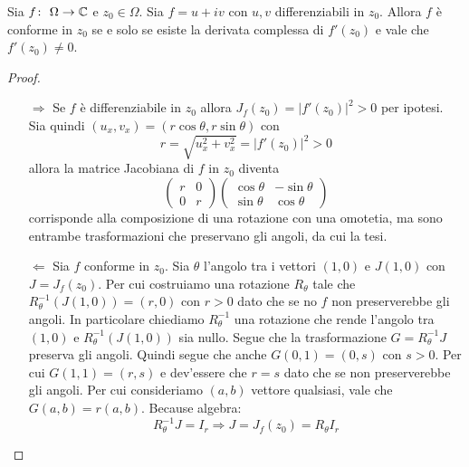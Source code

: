 \begin{theorem}
 \label{thr:conferme_sse_jacobiana_non_nulla}
  Sia $f \colon\ \Omega \rightarrow \mathbb{C}$ e $z_0 \in \Omega$. Sia $f = u + iv$ con $u,v$
  differenziabili in $z_0$. Allora $f$ è conforme in $z_0$ se e solo se esiste
  la derivata complessa di $f'(z_0)$ e vale che $f'(z_0) \neq 0$.
\end{theorem}
\begin{proof}\
  \begin{enumerate}
    \item[$\Rightarrow$] Se $f$ è differenziabile in $z_0$ allora $J_f(z_0) = 
      |f'(z_0)|^2 > 0$ per ipotesi. Sia quindi $(u_x,v_x) = (r\cos\theta, 
      r\sin\theta)$ con 
      \begin{equation*}
        r = \sqrt{u_x^2 + v_x^2} = |f'(z_0)|^2 > 0 
      \end{equation*}
      allora la matrice Jacobiana di $f$ in $z_0$ diventa
      \begin{equation*}
        \left(\begin{array}{cc}
          r & 0 \\
          0 & r
      \end{array}\right)
       \left( \begin{array}{cc}
          \cos\theta & - \sin \theta \\
          \sin \theta & \cos \theta
      \end{array}\right)
      \end{equation*}
      corrisponde alla composizione di una rotazione con una omotetia, ma sono
      entrambe trasformazioni che preservano gli angoli, da cui la tesi.
    \item[$\Leftarrow$] Sia $f$ conforme in $z_0$. Sia $\theta$ l'angolo tra
      i vettori $(1,0)$ e $J(1,0)$ con $J = J_f(z_0)$. Per cui costruiamo una
      rotazione $R_\theta$ tale che $R_\theta^{-1}(J(1,0)) = (r,0)$ con $r > 0$
      dato che se no $f$ non preserverebbe gli angoli. In particolare chiediamo
      $R^{-1}_\theta$ una rotazione che rende l'angolo tra $(1,0)$
      e $R^{-1}_\theta(J(1,0))$ sia nullo. Segue che la
      trasformazione $G = R^{-1}_\theta J$ preserva gli angoli. Quindi segue che
      anche $G (0,1) = (0, s)$ con $s > 0$.  Per cui $G(1,1) = (r,s)$
      e dev'essere che $r = s$ dato che se non preserverebbe gli angoli. Per cui
      consideriamo $(a,b)$ vettore qualsiasi, vale che $G(a,b) = r(a,b)$.
      Because algebra: 
      \begin{equation*}
        R^{-1}_\theta J = I_r \Longrightarrow J = J_f(z_0) = R_\theta I_r

\end{equation*}
\end{enumerate}
\end{proof}
